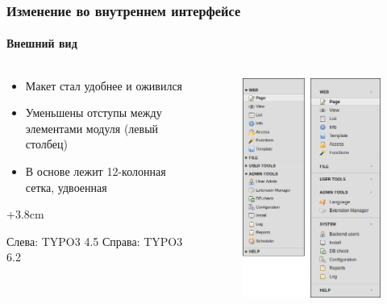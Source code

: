 
\begin{frame}[fragile]
	\frametitle{Изменение во внутреннем интерфейсе}
	\framesubtitle{Внешний вид}

	\begin{columns}[T]

		\begin{column}{.5\textwidth}
			\begin{itemize}
				\item Макет стал удобнее и оживился
				\item Уменьшены отступы между элементами модуля (левый столбец)
				\item В основе лежит 12-колонная сетка, удвоенная
			\end{itemize}

			\advance\leftskip+3.8cm

            \smaller
                Слева: TYPO3 4.5\newline
                Справа: TYPO3 6.2
            \normalsize
		\end{column}

		\begin{column}{.5\textwidth}
			\begin{figure}\vspace*{-0.4cm}
				\includegraphics[width=0.6\linewidth]{Images/BackendChanges/VisualAppearance.png}
			\end{figure}
		\end{column}

	\end{columns}

\end{frame}

